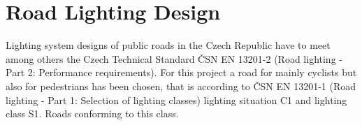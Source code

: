 \section{Road Lighting Design}
Lighting system designs of public roads in the Czech Republic have to meet among others the Czech Technical Standard ČSN EN 13201-2 (Road lighting - Part 2: Performance requirements). For this project a road for mainly cyclists but also for pedestrians has been chosen, that is according to ČSN EN 13201-1 (Road lighting - Part 1: Selection of lighting classes) lighting situation C1 and lighting class S1. Roads conforming to this class.